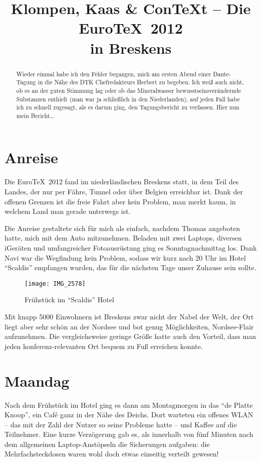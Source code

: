 \documentclass[12pt,ngerman]{dtk}
\title{Klompen, Kaas \&  Con\TeX t -- Die Euro\TeX~2012 \\ in Breskens}
\begin{document}
\maketitle

\begin{abstract}
Wieder einmal habe ich den Fehler begangen, mich am ersten Abend einer Dante-Tagung in die Nähe des
 DTK Chefredakteurs Herbert  zu begeben. Ich weiß auch nicht, ob es an der guten Stimmung lag oder
 ob das Mineralwasser bewusstseinsverändernde Substanzen enthielt (man war ja schließlich in den
 Niederlanden), auf jeden Fall habe ich zu schnell zugesagt, als es darum ging, den Tagungsbericht zu
 verfassen. Hier nun mein Bericht\dots
\end{abstract}


\section{Anreise}

Die Euro\TeX~2012 fand im niederländischen Breskens statt, in dem Teil des Landes, der nur per Fähre,
 Tunnel oder über Belgien erreichbar ist. Dank der offenen Grenzen ist die freie Fahrt aber kein Problem,
 man merkt kaum, in welchem Land man gerade unterwegs ist.

Die Anreise gestaltete sich für mich als einfach, nachdem Thomas angeboten hatte, mich mit dem Auto
 mitzunehmen. Beladen mit zwei Laptops, diversen iGeräten und umfangreicher Fotoausrüstung ging es
 Sonntagnachmittag los. Dank Navi war die Wegfindung kein Problem, sodass wir kurz nach 20 Uhr im
 Hotel \enquote{Scaldis} empfangen wurden, das für die nächsten Tage unser Zuhause sein sollte.

\begin{figure}
\centering
\texttt{[image: IMG\_2578]}
\caption{Frühstück im \enquote{Scaldis} Hotel}
\end{figure}

Mit knapp 5000 Einwohnern ist Breskens zwar nicht der Nabel der Welt, der Ort liegt aber sehr schön an
 der Nordsee und bot genug Möglichkeiten, Nordsee-Flair aufzunehmen. Die vergleichsweise geringe
 Größe hatte auch den Vorteil, dass man jeden konferenz-relevanten Ort bequem zu Fuß erreichen
 konnte.

\section{Maandag}

Nach dem Frühstück im Hotel ging es dann am Montagmorgen in das \enquote{de Platte Knoop}, ein
 Café ganz in der Nähe des Deichs. Dort warteten ein offenes WLAN -- das mit der Zahl der Nutzer so
 seine Probleme hatte -- und Kaffee auf die Teilnehmer. Eine kurze Verzögerung gab es, als innerhalb von
 fünf Minuten nach dem allgemeinen Laptop-Anstöpseln die Sicherungen aufgaben: die
 Mehrfachsteckdosen waren wohl doch etwas einseitig verteilt gewesen!
\end{document}

